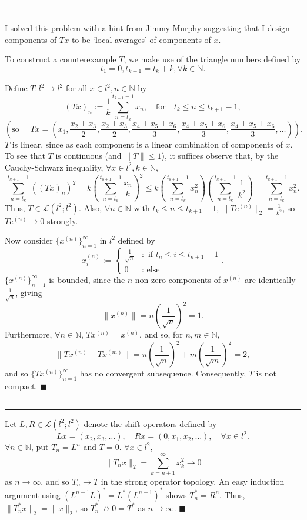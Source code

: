 \documentclass[11pt]{article}
\newcounter{questionCounter}
\newcounter{partCounter}[questionCounter]
\newenvironment{question}[2][\arabic{questionCounter}]{%
    \setcounter{partCounter}{0}%
    \vspace{.25in} \hrule \vspace{0.5em}%
        \noindent{\bf #2}%
    \vspace{0.8em} \hrule \vspace{.10in}%
    \addtocounter{questionCounter}{1}%
}{}
\renewcommand{\qed}{\quad $\blacksquare$}
\newcommand{\N}{\mathbb{N}} %
\renewcommand{\L}{\mathcal{L}} %
\begin{document}
\begin{question}{Problem 2}
I solved this problem with a hint from Jimmy Murphy suggesting that I design
components of $Tx$ to be `local averages' of components of $x$.

To construct a counterexample $T$, we make use of the triangle numbers defined
by
\[t_1 = 0, t_{k + 1} = t_k + k, \forall k \in \N.\]

Define $T : l^2 \to l^2$ for all $x \in l^2, n \in \N$ by
\[(Tx)_n
   := \frac1k \sum_{n = t_k}^{t_{k + 1} - 1} x_n,
        \quad \mbox{for} \quad t_k \leq n \leq t_{k + 1} - 1,
\]
\[(\mbox{so } \quad Tx = \left( x_1, \frac{x_2 + x_3}{2},
        \frac{x_2 + x_3}{2}, \frac{x_4 + x_5 + x_6}{3},
          \frac{x_4 + x_5 + x_6}{3}, \frac{x_4 + x_5 + x_6}{3}, \dots \right)
  ).
\]
$T$ is linear, since as each component is a linear combination of components of
$x$. To see that $T$ is continuous (and $\|T\| \leq 1$), it suffices observe
that, by the Cauchy-Schwarz inequality,
$\forall x \in l^2, k \in \N$,
\[\sum_{n = t_k}^{t_{k + 1} - 1} \left( (Tx)_n \right)^2
    = k \left( \sum_{n = t_k}^{t_{k + 1} - 1} \frac{x_n}{k} \right)^2
    \leq k \left( \sum_{n = t_k}^{t_{k + 1} - 1} x_n^2 \right)
        \left( \sum_{n = t_k}^{t_{k + 1} - 1} \frac{1}{k^2} \right)
    = \sum_{n = t_k}^{t_{k + 1} - 1} x_n^2.
\]
Thus, $T \in \L(l^2;l^2)$. Also, $\forall n \in \N$ with
$t_k \leq n \leq t_{k + 1} - 1$, $\|Te^{(n)}\|_2 = \frac{1}{k^2}$, so
$Te^{(n)} \to 0$ strongly.

Now consider $\{x^{(n)}\}_{n = 1}^\infty$ in $l^2$ defined by
\[x^{(n)}_i
    := \left\{
        \begin{array}{cl}
            \frac{1}{\sqrt n} & : \mbox{ if } t_n \leq i \leq t_{n + 1} - 1 \\
            0                 & : \mbox{ else }
        \end{array}
    \right..
\]
$\{x^{(n)}\}_{n = 1}^\infty$ is bounded, since the $n$ non-zero components of
$x^{(n)}$ are identically $\frac{1}{\sqrt n}$, giving
\[\|x^{(n)}\| = n\left( \frac{1}{\sqrt n} \right)^2 = 1.\]
Furthermore, $\forall n \in \N$, $Tx^{(n)} = x^{(n)}$, and so, for
$n, m \in \N$,
\[\|Tx^{(n)} - Tx^{(m)}\| = n\left( \frac{1}{\sqrt n} \right)^2
    + m\left( \frac{1}{\sqrt m} \right)^2 = 2,
\]
and so $\{Tx^{(n)}\}_{n = 1}^\infty$ has no convergent subsequence.
Consequently, $T$ is not compact. \qed
\end{question}

\begin{question}{Problem 3}
Let $L,R \in \L(l^2;l^2)$ denote the shift operators defined by
\[Lx = (x_2,x_3,\dots), \quad Rx = (0,x_1,x_2,\dots), \quad
    \forall x \in l^2.\]
$\forall n \in \N$, put $T_n = L^n$ and $T = 0$. $\forall x \in l^2$,
\[\|T_nx\|_2
    = \sum_{k = n + 1}^\infty x_k^2
    \to 0
\]
as $n \to \infty$, and so $T_n \to T$ in the strong operator topology. An easy
induction argument using $(L^{n - 1}L)^* = L^*(L^{n - 1})^*$ shows
$T_n^* = R^n$. Thus, $\|T_n^*x\|_2 = \|x\|_2$, so $T_n^* \not\to 0 = T^*$
as $n \to \infty$. \qed
\end{question}
\end{document}
